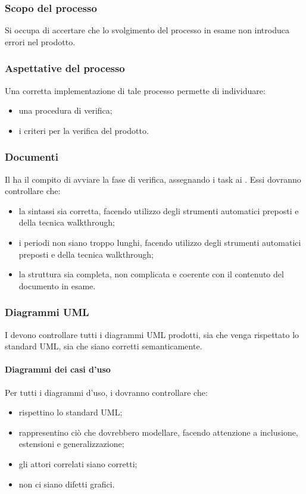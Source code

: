 \subsubsection{Scopo del processo}
Si occupa di accertare che lo svolgimento del processo in esame non introduca errori nel prodotto.
\subsubsection{Aspettative del processo}
Una corretta implementazione di tale processo permette di individuare:
\begin{itemize}
	\item una procedura di verifica;
	\item i criteri per la verifica del prodotto.
\end{itemize}
\subsubsection{Documenti}
Il \RESP{} ha il compito di avviare la fase di verifica, assegnando i task ai \VERP{}. Essi dovranno controllare che:
\begin{itemize}
	\item la sintassi sia corretta, facendo utilizzo degli strumenti automatici preposti e della tecnica walkthrough;
	\item i periodi non siano troppo lunghi, facendo utilizzo degli strumenti automatici preposti e della tecnica walkthrough;
	\item la struttura sia completa, non complicata e coerente con il contenuto del documento in esame.
\end{itemize}

\subsubsection{Diagrammi UML}
I \VERP{} devono controllare tutti i diagrammi UML prodotti, sia che
venga rispettato lo standard UML, sia che siano corretti semanticamente.
\paragraph{Diagrammi dei casi d'uso}
Per tutti i diagrammi d'uso, i \VERP{} dovranno controllare che:
\begin{itemize}
	\item rispettino lo standard UML;
	\item rappresentino ciò che dovrebbero modellare, facendo attenzione a inclusione, estensioni e generalizzazione;
	\item gli attori correlati siano corretti;
	\item non ci siano difetti grafici.
\end{itemize}
